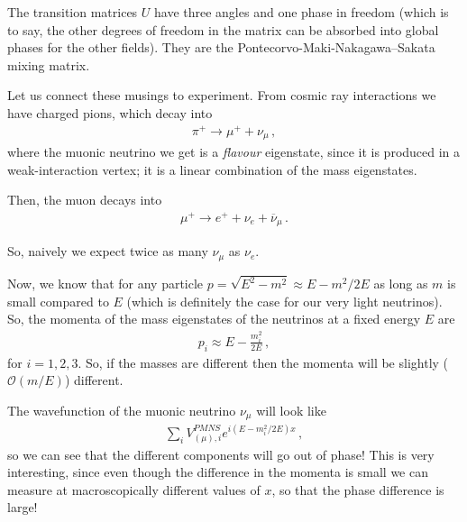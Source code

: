 \documentclass[main.tex]{subfiles}
\begin{document}
The transition matrices \(U\) have three angles and one phase in freedom (which is to say, the other degrees of freedom in the matrix can be absorbed into global phases for the other fields). 
They are the Pontecorvo-Maki-Nakagawa–Sakata mixing matrix. 




Let us connect these musings to experiment.
From cosmic ray interactions we have charged pions, which decay into 
%
\begin{align}
\pi^{+} \to \mu^+ + \nu_{\mu }
\,,
\end{align}
%
where the muonic neutrino we get is a \emph{flavour} eigenstate, since it is produced in a weak-interaction vertex; it is a linear combination of the mass eigenstates. 

Then, the muon decays into 
%
\begin{align}
\mu^+ \to e^{+} + \nu_{e} + \overline{\nu}_{\mu }
\,.
\end{align}

So, naively we expect twice as many \(\nu_{\mu }\) as \(\nu_{e}\).

Now, we know that for any particle \(p = \sqrt{E^2 - m^2} \approx E - m^2 / 2E\) as long as \(m\) is small compared to \(E\) (which is definitely the case for our very light neutrinos). So, the momenta of the mass eigenstates of the neutrinos at a fixed energy \(E\)  are 
%
\begin{align}
p_i \approx E - \frac{m_i^2}{2E}
\,,
\end{align}
%
for \(i = 1, 2, 3\). So, if the masses are different then the momenta will be slightly (\(\mathcal{O} (m/E)\)) different. 

The wavefunction of the muonic neutrino \(\nu_{\mu }\) will look like 
%
\begin{align}
\sum _{i} V^{PMNS}_{(\mu ), i} e^{i (E - m_i^2 /2E) x}
\,,
\end{align}
%
so we can see that the different components will go out of phase! This is very interesting, since even though the difference in the momenta is small we can measure at macroscopically different values of \(x\), so that the phase difference is large! 
\end{document}
